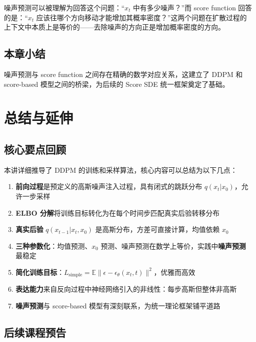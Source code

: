 \documentclass[a4paper]{article}
\begin{document}
噪声预测可以被理解为回答这个问题：``$x_t$ 中有多少噪声？''而 score function 回答的是：``$x_t$ 应该往哪个方向移动才能增加其概率密度？''这两个问题在扩散过程的上下文中本质上是等价的——去除噪声的方向正是增加概率密度的方向。

\subsection{本章小结}

噪声预测与 score function 之间存在精确的数学对应关系，这建立了 DDPM 和 score-based 模型之间的桥梁，为后续的 Score SDE 统一框架奠定了基础。


\section{总结与延伸}

\subsection{核心要点回顾}

本讲详细推导了 DDPM 的训练和采样算法，核心内容可以总结为以下几点：

\begin{enumerate}
    \item \textbf{前向过程}是预定义的高斯噪声注入过程，具有闭式的跳跃分布 $q(x_t|x_0)$，允许一步采样
    \item \textbf{ELBO 分解}将训练目标转化为在每个时间步匹配真实后验转移分布
    \item \textbf{真实后验} $q(x_{t-1}|x_t, x_0)$ 是高斯分布，方差可直接计算，均值依赖 $x_0$
    \item \textbf{三种参数化}：均值预测、$x_0$ 预测、噪声预测在数学上等价，实践中\textbf{噪声预测}最稳定
    \item \textbf{简化训练目标}：$L_{\text{simple}} = \mathbb{E}\|\epsilon - \epsilon_\theta(x_t, t)\|^2$，优雅而高效
    \item \textbf{表达能力}来自反向过程中神经网络引入的非线性：每步高斯但整体非高斯
    \item \textbf{噪声预测}与 score-based 模型有深刻联系，为统一理论框架铺平道路
\end{enumerate}

\subsection{后续课程预告}
\end{document}

